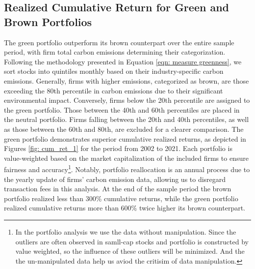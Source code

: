 \documentclass[12pt]{article}
\begin{document}
\subsection{Realized Cumulative Return for Green and Brown Portfolios}

The green portfolio outperform its brown counterpart over the entire sample period, with firm total carbon emissions determining their categorization. Following the methodology presented in Equation \ref{eqn: measure greenness}, we sort stocks into quintiles monthly based on their industry-specific carbon emissions. Generally, firms with higher emissions, categorized as brown, are those exceeding the 80th percentile in carbon emissions due to their significant environmental impact. Conversely, firms below the 20th percentile are assigned to the green portfolio. Those between the 40th and 60th percentiles are placed in the neutral portfolio. Firms falling between the 20th and 40th percentiles, as well as those between the 60th and 80th, are excluded for a clearer comparison. The green portfolio demonstrates superior cumulative realized returns, as depicted in Figures \ref{fig: cum_ret_1} for the period from 2002 to 2021. Each portfolio is value-weighted based on the market capitalization of the included firms to ensure fairness and accuracy\footnote{In the portfolio analysis we use the data without manipulation. Since the outliers are often observed in samll-cap stocks and portfolio is constructed by value weighted, so the influence of these outliers will be minimized. And the the un-manipulated data help us aviod the critisim of data manipulation.}. Notably, portfolio reallocation is an annual process due to the yearly update of firms' carbon emission data, allowing us to disregard transaction fees in this analysis. At the end of the sample period the brown portfolio realized less than 300\% cumulative returns, while the green portfolio realized cumulative returns more than 600\% twice higher its brown counterpart.
\end{document}
